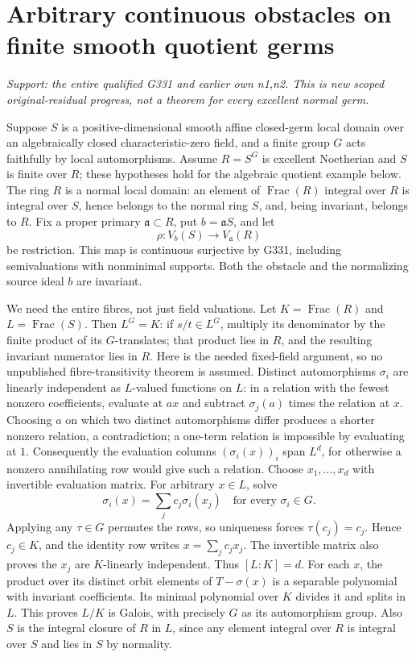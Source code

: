 \section{Arbitrary continuous obstacles on finite smooth quotient germs}
\label{sec:quotient}
\textit{Support: the entire qualified G331 and earlier own n1,n2. This is new scoped original-residual progress, not a theorem for every excellent normal germ.}

Suppose $S$ is a positive-dimensional smooth affine closed-germ local domain over an algebraically closed characteristic-zero field, and a finite group $G$ acts faithfully by local automorphisms. Assume $R=S^G$ is excellent Noetherian and $S$ is finite over $R$; these hypotheses hold for the algebraic quotient example below. The ring $R$ is a normal local domain: an element of $\operatorname{Frac}(R)$ integral over $R$ is integral over $S$, hence belongs to the normal ring $S$, and, being invariant, belongs to $R$. Fix a proper primary $\mathfrak a\subset R$, put $b=\mathfrak aS$, and let
\[
 \rho:V_b(S)\longrightarrow V_{\mathfrak a}(R)
\]
be restriction. This map is continuous surjective by G331, including semivaluations with nonminimal supports. Both the obstacle and the normalizing source ideal $b$ are invariant.

We need the entire fibres, not just field valuations. Let $K=\operatorname{Frac}(R)$ and $L=\operatorname{Frac}(S)$. Then $L^G=K$: if $s/t\in L^G$, multiply its denominator by the finite product of its $G$-translates; that product lies in $R$, and the resulting invariant numerator lies in $R$. Here is the needed fixed-field argument, so no unpublished fibre-transitivity theorem is assumed. Distinct automorphisms $\sigma_i$ are linearly independent as $L$-valued functions on $L$: in a relation with the fewest nonzero coefficients, evaluate at $ax$ and subtract $\sigma_j(a)$ times the relation at $x$. Choosing $a$ on which two distinct automorphisms differ produces a shorter nonzero relation, a contradiction; a one-term relation is impossible by evaluating at $1$. Consequently the evaluation columns $(\sigma_i(x))_i$ span $L^d$, for otherwise a nonzero annihilating row would give such a relation. Choose $x_1,\ldots,x_d$ with invertible evaluation matrix. For arbitrary $x\in L$, solve
\[
 \sigma_i(x)=\sum_j c_j\sigma_i(x_j)\quad\text{for every }\sigma_i\in G.
\]
Applying any $\tau\in G$ permutes the rows, so uniqueness forces $\tau(c_j)=c_j$. Hence $c_j\in K$, and the identity row writes $x=\sum_jc_jx_j$. The invertible matrix also proves the $x_j$ are $K$-linearly independent. Thus $[L:K]=d$. For each $x$, the product over its distinct orbit elements of $T-\sigma(x)$ is a separable polynomial with invariant coefficients. Its minimal polynomial over $K$ divides it and splits in $L$. This proves $L/K$ is Galois, with precisely $G$ as its automorphism group. Also $S$ is the integral closure of $R$ in $L$, since any element integral over $R$ is integral over $S$ and lies in $S$ by normality.

